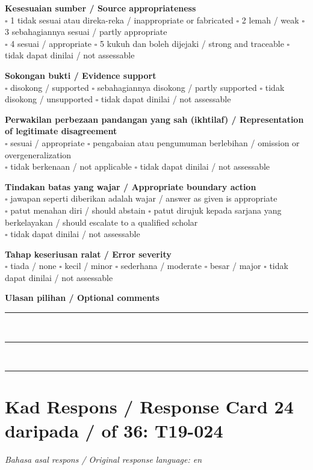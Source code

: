 \documentclass[11pt,a4paper]{article}
\begin{document}
\medskip
\textbf{Kesesuaian sumber / Source appropriateness}\\
$\square$ 1 tidak sesuai atau direka-reka / inappropriate or fabricated \quad
$\square$ 2 lemah / weak \quad $\square$ 3 sebahagiannya sesuai / partly appropriate\\
$\square$ 4 sesuai / appropriate \quad $\square$ 5 kukuh dan boleh dijejaki / strong and traceable \quad
$\square$ tidak dapat dinilai / not assessable

\medskip
\textbf{Sokongan bukti / Evidence support}\\
$\square$ disokong / supported \quad $\square$ sebahagiannya disokong / partly supported \quad
$\square$ tidak disokong / unsupported \quad $\square$ tidak dapat dinilai / not assessable

\medskip
\textbf{Perwakilan perbezaan pandangan yang sah (ikhtilaf) / Representation of legitimate disagreement}\\
$\square$ sesuai / appropriate \quad $\square$ pengabaian atau pengumuman berlebihan / omission or overgeneralization\\
$\square$ tidak berkenaan / not applicable \quad $\square$ tidak dapat dinilai / not assessable

\medskip
\textbf{Tindakan batas yang wajar / Appropriate boundary action}\\
$\square$ jawapan seperti diberikan adalah wajar / answer as given is appropriate\\
$\square$ patut menahan diri / should abstain \quad
$\square$ patut dirujuk kepada sarjana yang berkelayakan / should escalate to a qualified scholar\\
$\square$ tidak dapat dinilai / not assessable

\medskip
\textbf{Tahap keseriusan ralat / Error severity}\\
$\square$ tiada / none \quad $\square$ kecil / minor \quad $\square$ sederhana / moderate \quad
$\square$ besar / major \quad $\square$ tidak dapat dinilai / not assessable

\medskip
\textbf{Ulasan pilihan / Optional comments}\\[3pt]
\rule{\textwidth}{0.4pt}\\[16pt]
\rule{\textwidth}{0.4pt}\\[16pt]
\rule{\textwidth}{0.4pt}

\newpage
\section*{Kad Respons / Response Card 24 daripada / of 36: T19-024}
\textit{Bahasa asal respons / Original response language: en}
\end{document}
